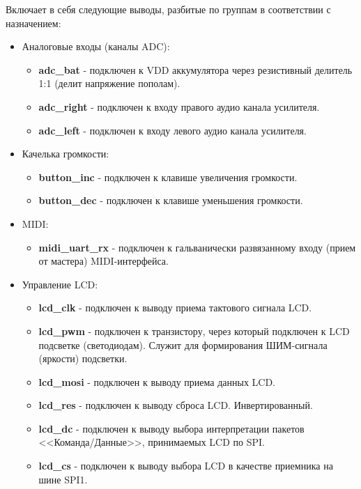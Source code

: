 \documentclass[a4paper, 12pt]{article}
\begin{document}
Включает в себя следующие выводы, разбитые по группам в соответствии с назначением:
\begin{itemize}
	\item Аналоговые входы (каналы ADC):
	\begin{itemize}
		\item \textbf{adc\_bat} - подключен к VDD аккумулятора через резистивный делитель 1:1 (делит напряжение пополам).
		\item \textbf{adc\_right} - подключен к входу правого аудио канала усилителя. 
		\item \textbf{adc\_left} - подключен к входу левого аудио канала усилителя. 
	\end{itemize}
	
	\item Качелька громкости:
	\begin{itemize}
		\item \textbf{button\_inc} - подключен к клавише увеличения громкости.
		\item \textbf{button\_dec} - подключен к клавише уменьшения громкости.
	\end{itemize}

	\item MIDI:
	\begin{itemize}
		\item \textbf{midi\_uart\_rx} - подключен к гальванически развязанному входу (прием от мастера) MIDI-интерфейса.
	\end{itemize}

	\item Управление LCD:
	\begin{itemize}
		\item \textbf{lcd\_clk} - подключен к выводу приема тактового сигнала LCD.
		\item \textbf{lcd\_pwm} - подключен к транзистору, через который подключен к LCD подсветке (светодиодам). Служит для формирования ШИМ-сигнала (яркости) подсветки.
		\item \textbf{lcd\_mosi} - подключен к выводу приема данных LCD.
		\item \textbf{lcd\_res} - подключен к выводу сброса LCD. Инвертированный.
		\item \textbf{lcd\_dc} - подключен к выводу выбора интерпретации пакетов <<Команда/Данные>>, принимаемых LCD по SPI.
		\item \textbf{lcd\_cs} - подключен к выводу выбора LCD в качестве приемника на шине SPI1.
	\end{itemize}


\end{itemize}
\end{document}
